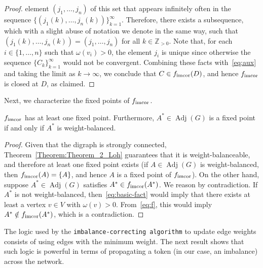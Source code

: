 \documentclass[final]{siamltex}
\begin{document}
\begin{proof}
  element $ (j_1,\ldots, j_n)$ of this set that appears infinitely
  often in the sequence $\{(j_1(k),\ldots,
  j_n(k))\}_{k=1}^{\infty}$. Therefore, there exists a subsequence,
  which with a slight abuse of notation we denote in the same way,
  such that $(j_1(k),\ldots, j_n(k)) = (j_1,\dots,j_n)$ for all $k \in
  \mathbb{Z}_{>0} $.  Note that, for each $i \in {\{1,\ldots, {n}\}}$ such that
  $\omega(v_i) >0$, the element $j_i$ is unique since otherwise the
  sequence $ \{C_k\}_{k=1}^{\infty} $ would not be
  convergent. Combining these facts with~\eqref{eq:aux} and taking the
  limit as $ k \rightarrow \infty$, we conclude that $ C \in
  {{f}_{\textup{{imcor}}}}(D) $, and hence $ {{f}_{\textup{{imcor}}}} $ is closed at
  $ D $, as claimed.
\end{proof}

Next, we characterize the fixed points of ${{f}_{\textup{{imcor}}}}$.

\begin{lemma}\label{lemma:eq_f_wb}
  ${{f}_{\textup{{imcor}}}}$ has at least one fixed point. Furthermore, $ A^*
  \in {\operatorname{Adj}}(G) $ is a fixed point if and only if $A^*$ is
  weight-balanced.
\end{lemma}
\begin{proof}
  Given that the digraph is strongly connected,
  Theorem~\ref{Theorem:Theorem_2_Loh} guarantees that it is
  weight-balanceable, and therefore at least one fixed point exists
  (if $ A\in {\operatorname{Adj}}(G) $ is weight-balanced, then ${{f}_{\textup{{imcor}}}}(A)
  = \{A\}$, and hence $A$ is a fixed point of $
  {{f}_{\textup{{imcor}}}}$). On the other hand, suppose $ A^*\in {\operatorname{Adj}}(G) $
  satisfies $A^* \in {{f}_{\textup{{imcor}}}}(A^*) $. We reason by
  contradiction. If $ A^* $ is not weight-balanced,
  then~\eqref{eq:basic-fact} would imply that there exists at least a
  vertex $ v\in V $ with $ \omega(v)>0 $.  From~\eqref{eq:f}, this
  would imply $A^* \notin {{f}_{\textup{{imcor}}}}(A^*)$, which is a
  contradiction.
\end{proof} 

The logic used by the {\texttt{imbalance-correcting algorithm}\xspace} to update edge weights consists of using
edges with the minimum weight. The next result shows that such logic
is powerful in terms of propagating a token (in our case, an
imbalance) across the network.
\end{document}
